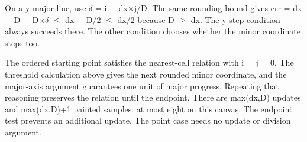 On a y-major line, use \ensuremath{\delta} = i \ensuremath{-} dx\ensuremath{\times}j/D. The same rounding bound gives err
= dx \ensuremath{-} D \ensuremath{-} D\ensuremath{\times}\ensuremath{\delta} \ensuremath{\leq} dx \ensuremath{-} D/2 \ensuremath{\leq} dx/2 because D \ensuremath{\geq} dx. The y-step condition
always succeeds there. The other condition chooses whether the minor
coordinate steps too.

The ordered starting point satisfies the nearest-cell relation with i =
j = 0. The threshold calculation above gives the next rounded minor
coordinate, and the major-axis argument guarantees one unit of major
progress. Repeating that reasoning preserves the relation until the
endpoint. There are max(dx,D) updates and max(dx,D)+1 painted samples,
at most eight on this canvas. The endpoint test prevents an additional
update. The point case needs no update or division argument.


